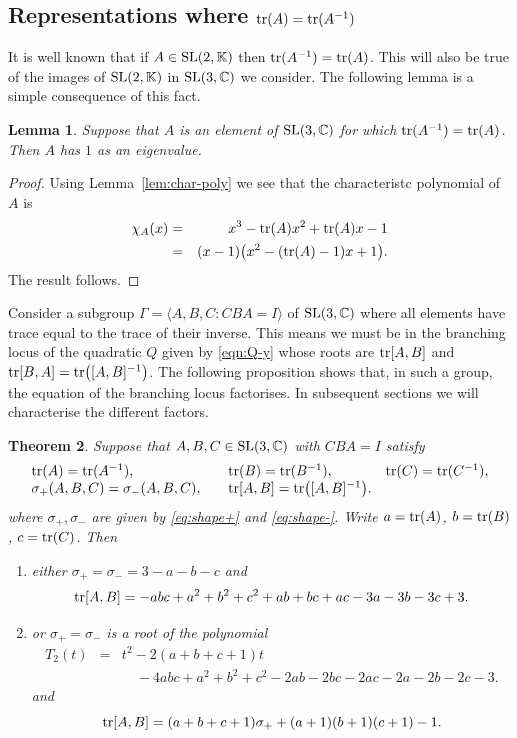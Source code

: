 \documentclass[11pt]{amsart}
\newtheorem{theorem}{Theorem}[section]
\newtheorem{lemma}[theorem]{Lemma}
\numberwithin{equation}{section}
\begin{document}
\subsection{Representations where ${\rm tr}(A)={\rm tr}(A^{-1})$}

It is well known that if $A\in{\rm SL}(2,{\mathbb K})$ then ${\rm tr}(A^{-1})={\rm tr}(A)$. This will also be true
of the images of ${\rm SL}(2,{\mathbb K})$ in ${\rm SL}(3,{\mathbb C})$ we consider. The following lemma
is a simple consequence of this fact.

\begin{lemma}\label{lem-1-evalue}
Suppose that $A$ is an element of ${\rm SL}(3,{\mathbb C})$  for which ${\rm tr}(A^{-1})={\rm tr}(A)$. Then
$A$ has $1$ as an eigenvalue.
\end{lemma}

\begin{proof}
Using Lemma~\ref{lem:char-poly} we see that the characteristc polynomial of $A$ is
\begin{eqnarray*}
\chi_A(x) & = & x^3-{\rm tr}(A)x^2+{\rm tr}(A)x-1 \\
& = & (x-1)\bigl(x^2 -({\rm tr}(A)-1)x+1\bigr).
\end{eqnarray*}
The result follows.
\end{proof}

\medskip

Consider a subgroup $\Gamma=\langle A,B,C:CBA=I\rangle$ of ${\rm SL}(3,{\mathbb C})$ where all elements
have trace equal to the trace of their inverse. This means we must be in the branching locus of the quadratic
$Q$ given by \eqref{eqn:Q-y} whose roots are ${\rm tr}[A,B]$ and ${\rm tr}[B,A]={\rm tr}\bigl([A,B]^{-1}\bigr)$.
The following proposition shows that, in such a group, the equation of the branching locus factorises. In subsequent
sections we will characterise the different factors.

\begin{theorem}\label{thm:branch-fact}
Suppose that $A,B,C\in{\rm SL}(3,{\mathbb C})$ with $CBA=I$ satisfy
$$
\begin{array}{lll}
{\rm tr}(A)={\rm tr}(A^{-1}),\quad & {\rm tr}(B)={\rm tr}(B^{-1}),\quad &{\rm tr}(C)={\rm tr}(C^{-1}),\\
\sigma_+(A,B,C)=\sigma_-(A,B,C),\quad & {\rm tr}[A,B]={\rm tr}\bigl([A,B]^{-1}\bigr). &
\end{array}
$$
where $\sigma_+,\sigma_-$ are given by \eqref{eq:shape+} and \eqref{eq:shape-}. 
Write $a={\rm tr}(A)$, $b={\rm tr}(B)$, $c={\rm tr}(C)$. Then 
\begin{enumerate}
\item[(1)] either $\sigma_+=\sigma_- = 3-a-b-c$
and
$$
{\rm tr}[A,B] = -abc+a^2+b^2+c^2+ab+bc+ac -3a-3b-3c+3.
$$
\item[(2)] or $\sigma_+=\sigma_-$ is a root of the polynomial
\begin{eqnarray*}
T_2(t) & = & t^2-2(a+b+c+1)t \\
&& \quad -4abc+a^2+b^2+c^2-2ab-2bc-2ac-2a-2b-2c-3.
\end{eqnarray*}
and
$$
{\rm tr}[A,B] = (a+b+c+1)\sigma_++(a+1)(b+1)(c+1)-1.
$$
\end{enumerate}
\end{theorem}
\end{document}
